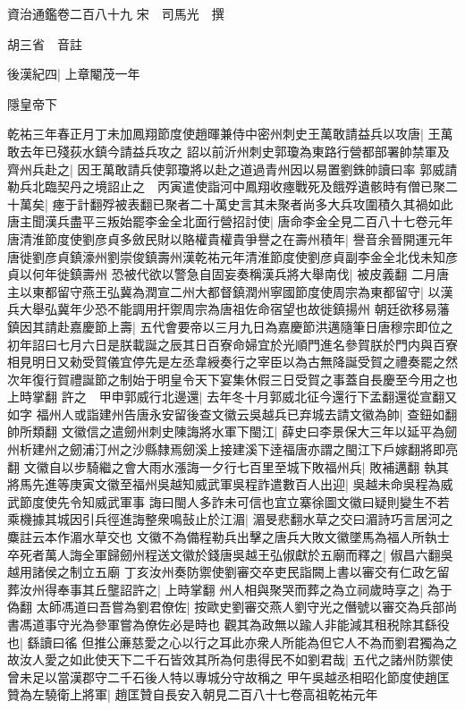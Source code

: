 資治通鑑卷二百八十九
宋　司馬光　撰

胡三省　音註

後漢紀四|{
	上章閹茂一年}


隱皇帝下

乾祐三年春正月丁未加鳳翔節度使趙暉兼侍中密州刺史王萬敢請益兵以攻唐|{
	王萬敢去年已殘荻水鎮今請益兵攻之}
詔以前沂州刺史郭瓊為東路行營都部署帥禁軍及齊州兵赴之|{
	因王萬敢請兵使郭瓊將以赴之道過青州因以易置劉銖帥讀曰率}
郭威請勒兵北臨契丹之境詔止之　丙寅遣使詣河中鳳翔收瘞戰死及餓殍遺骸時有僧已聚二十萬矣|{
	瘞于計翻殍被表翻已聚者二十萬史言其未聚者尚多大兵攻圍積久其禍如此}
唐主聞漢兵盡平三叛始罷李金全北面行營招討使|{
	唐命李金全見二百八十七卷元年}
唐清淮節度使劉彦貞多斂民財以賂權貴權貴爭譽之在壽州積年|{
	譽音余晉開運元年唐徙劉彦貞鎮濠州劉崇俊鎮壽州漢乾祐元年清淮節度使劉彦貞副李金全北伐未知彦貞以何年徙鎮壽州}
恐被代欲以警急自固妄奏稱漢兵將大舉南伐|{
	被皮義翻}
二月唐主以東都留守燕王弘冀為潤宣二州大都督鎮潤州寧國節度使周宗為東都留守|{
	以漢兵大舉弘冀年少恐不能調用扞禦周宗為唐祖佐命宿望也故徙鎮揚州}
朝廷欲移易藩鎮因其請赴嘉慶節上壽|{
	五代會要帝以三月九日為嘉慶節洪邁隨筆日唐穆宗即位之初年詔曰七月六日是朕載誕之辰其日百寮命婦宜於光順門進名參賀朕於門内與百寮相見明日又勑受賀儀宜停先是左丞韋綬奏行之宰臣以為古無降誕受賀之禮奏罷之然次年復行賀禮誕節之制始于明皇令天下宴集休假三日受賀之事蓋自長慶至今用之也上時掌翻}
許之　甲申郭威行北邊還|{
	去年冬十月郭威北征今還行下孟翻還從宣翻又如字}
福州人或詣建州告唐永安留後查文徽云吳越兵已弃城去請文徽為帥|{
	查鈕如翻帥所類翻}
文徽信之遣劒州刺史陳誨將水軍下閩江|{
	薛史曰李景保大三年以延平為劒州析建州之劒浦汀州之沙縣隸焉劒溪上接建溪下逹福唐亦謂之閩江下戶嫁翻將即亮翻}
文徽自以步騎繼之會大雨水漲誨一夕行七百里至城下敗福州兵|{
	敗補邁翻}
執其將馬先進等庚寅文徽至福州吳越知威武軍吳程詐遣數百人出迎|{
	吳越未命吳程為威武節度使先令知威武軍事}
誨曰閩人多詐未可信也宜立寨徐圖文徽曰疑則變生不若乘機據其城因引兵徑進誨整衆鳴鼔止於江湄|{
	湄旻悲翻水草之交曰湄詩巧言居河之麋註云本作湄水草交也}
文徽不為備程勒兵出擊之唐兵大敗文徽墜馬為福人所執士卒死者萬人誨全軍歸劒州程送文徽於錢唐吳越王弘俶獻於五廟而釋之|{
	俶昌六翻吳越用諸侯之制立五廟}
丁亥汝州奏防禦使劉審交卒吏民詣闕上書以審交有仁政乞留葬汝州得奉事其丘壟詔許之|{
	上時掌翻}
州人相與聚哭而葬之為立祠歲時享之|{
	為于偽翻}
太師馮道曰吾嘗為劉君僚佐|{
	按歐史劉審交燕人劉守光之僭號以審交為兵部尚書馮道事守光為參軍嘗為僚佐必是時也}
觀其為政無以踰人非能減其租税除其繇役也|{
	繇讀曰徭}
但推公亷慈愛之心以行之耳此亦衆人所能為但它人不為而劉君獨為之故汝人愛之如此使天下二千石皆效其所為何患得民不如劉君哉|{
	五代之諸州防禦使曾未足以當漢郡守二千石後人特以專城分守故稱之}
甲午吳越丞相昭化節度使趙匡贊為左驍衛上將軍|{
	趙匡贊自長安入朝見二百八十七卷高祖乾祐元年}
